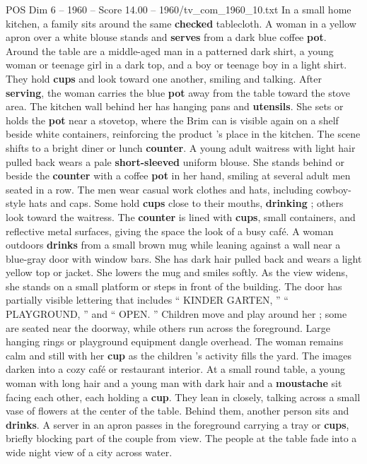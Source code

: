 \begin{textsample}{POS Dim 6 – 1960 – Score 14.00 – 1960/tv\_com\_1960\_10.txt}
In a small home kitchen, a family sits around the same \textbf{checked} tablecloth.
A woman in a yellow apron over a white blouse stands and \textbf{serves} from a dark blue coffee \textbf{pot}.
Around the table are a middle-aged man in a patterned dark shirt, a young woman or teenage girl in a dark top, and a boy or teenage boy in a light shirt.
They hold \textbf{cups} and look toward one another, smiling and talking.
After \textbf{serving}, the woman carries the blue \textbf{pot} away from the table toward the stove area.
The kitchen wall behind her has hanging pans and \textbf{utensils}.
She sets or holds the \textbf{pot} near a stovetop, where the Brim can is visible again on a shelf beside white containers, reinforcing the product ’s place in the kitchen.
The scene shifts to a bright diner or lunch \textbf{counter}.
A young adult waitress with light hair pulled back wears a pale \textbf{short-sleeved} uniform blouse.
She stands behind or beside the \textbf{counter} with a coffee \textbf{pot} in her hand, smiling at several adult men seated in a row.
The men wear casual work clothes and hats, including cowboy-style hats and caps.
Some hold \textbf{cups} close to their mouths, \textbf{drinking} ; others look toward the waitress.
The \textbf{counter} is lined with \textbf{cups}, small containers, and reflective metal surfaces, giving the space the look of a busy café.
A woman outdoors \textbf{drinks} from a small brown mug while leaning against a wall near a blue-gray door with window bars.
She has dark hair pulled back and wears a light yellow top or jacket.
She lowers the mug and smiles softly.
As the view widens, she stands on a small platform or steps in front of the building.
The door has partially visible lettering that includes “ KINDER GARTEN, ” “ PLAYGROUND, ” and “ OPEN. ” Children move and play around her ; some are seated near the doorway, while others run across the foreground.
Large hanging rings or playground equipment dangle overhead.
The woman remains calm and still with her \textbf{cup} as the children ’s activity fills the yard.
The images darken into a cozy café or restaurant interior.
At a small round table, a young woman with long hair and a young man with dark hair and a \textbf{moustache} sit facing each other, each holding a \textbf{cup}.
They lean in closely, talking across a small vase of flowers at the center of the table.
Behind them, another person sits and \textbf{drinks}.
A server in an apron passes in the foreground carrying a tray or \textbf{cups}, briefly blocking part of the couple from view.
The people at the table fade into a wide night view of a city across water.

\end{textsample}
